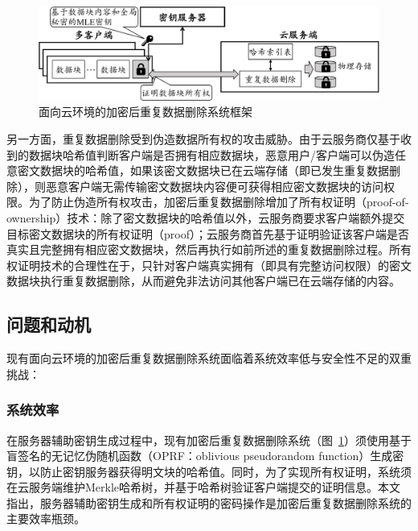 \begin{figure}[!htb]
    \small
    \centering
    \includegraphics[width=\textwidth]{pic/Cloud-encrypted-deduplication-logic.pdf}
    \caption{面向云环境的加密后重复数据删除系统框架}
    \label{fig:Cloud-based-encrypted-deduplication-storage-logic}
\end{figure}

另一方面，重复数据删除受到伪造数据所有权的攻击威胁\cite{harnik2010side,mulazzani11}。由于云服务商仅基于收到的数据块哈希值判断客户端是否拥有相应数据块，恶意用户/客户端可以伪造任意密文数据块的哈希值，如果该密文数据块已在云端存储（即已发生重复数据删除），则恶意客户端无需传输密文数据块内容便可获得相应密文数据块的访问权限。为了防止伪造所有权攻击，加密后重复数据删除增加了所有权证明（proof-of-ownership）技术\cite{halevi11}：除了密文数据块的哈希值以外，云服务商要求客户端额外提交目标密文数据块的所有权证明（proof）；云服务商首先基于证明验证该客户端是否真实且完整拥有相应密文数据块，然后再执行如前所述的重复数据删除过程。所有权证明技术的合理性在于，只针对客户端真实拥有（即具有完整访问权限）的密文数据块执行重复数据删除，从而避免非法访问其他客户端已在云端存储的内容。

\subsection{问题和动机}
\label{subsec:intro-problem}

现有面向云环境的加密后重复数据删除系统面临着系统效率低与安全性不足的双重挑战：

\subsubsection{系统效率} 
\label{subsubsec:intro-problem-performance}

在服务器辅助密钥生成过程中，现有加密后重复数据删除系统（图~\ref{fig:Cloud-based-encrypted-deduplication-storage-logic}）须使用基于盲签名\cite{armknecht2015transparent,bellare2013DupLESS}的无记忆伪随机函数（OPRF：oblivious pseudorandom function）生成密钥\cite{bellare2013DupLESS}，以防止密钥服务器获得明文块的哈希值。同时，为了实现所有权证明，系统须在云服务端维护Merkle哈希树，并基于哈希树验证客户端提交的证明信息\cite{halevi2011proofs}。本文指出，服务器辅助密钥生成和所有权证明的密码操作是加密后重复数据删除系统的主要效率瓶颈。

